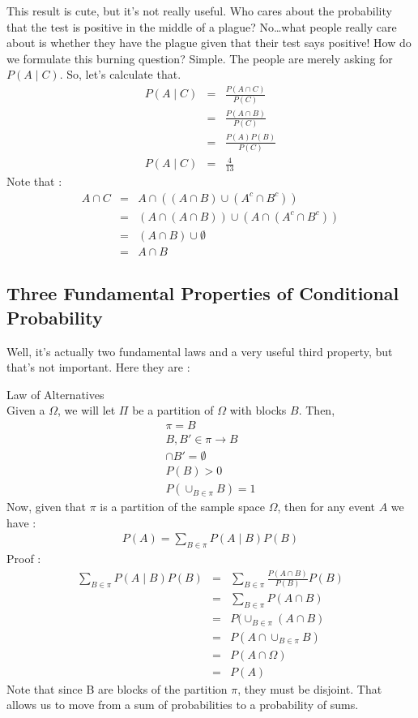 This result is cute, but it's not really useful.  Who cares about the probability that the test is positive in the middle of a plague?  No\ldots what people really care about is whether they have the plague given that their test says positive!  How do we formulate this burning question?  Simple.  The people are merely asking for $P(A \mid C)$.  So, let's calculate that.
\begin{eqnarray*}
P(A \mid C) &=& \frac{P(A \cap C)}{P(C)} \\
            &=& \frac{P(A \cap B)}{P(C)} \\
            &=& \frac{P(A)P(B)}{P(C)}\\
P(A \mid C) &=& \frac{4}{13}
\end{eqnarray*}
Note that : 
\begin{eqnarray*}
A \cap C &=& A \cap ((A \cap B) \cup (A^{c} \cap B^{c}))\\
         &=& (A \cap (A \cap B)) \cup (A \cap (A^{c} \cap B^{c}))\\
         &=& (A \cap B) \cup \emptyset\\
         &=& A \cap B
\end{eqnarray*}
\subsection{Three Fundamental Properties of Conditional Probability}
Well, it's actually two fundamental laws and a very useful third property, but that's not important.  Here they are :

Law of Alternatives\\
Given a $\Omega$, we will let $\Pi$ be a partition of $\Omega$ with blocks $B$.  Then,
\begin{eqnarray*}
\pi = {B} \\
B, B' \in \pi\rightarrow B \\
\cap B' = \emptyset \\
P(B) > 0 \\
P(\cup_{B \in \pi} B) = 1
\end{eqnarray*}
Now, given that $\pi$ is a partition of the sample space $\Omega$, then for any event $A$ we have : 
\begin{eqnarray*}
P(A) = \sum_{B \in \pi}{P(A \mid B)P(B)}
\end{eqnarray*}
Proof : 
\begin{eqnarray*}
\sum_{B \in \pi}{P(A \mid B)P(B)} &=& \sum_{B \in \pi}{\frac{P(A \cap B)}{P(B)} P(B)} \\
                                  &=& \sum_{B \in \pi}{P(A \cap B)} \\
                                  &=& P(\cup_{B \in \pi}{(A \cap B)} \\
                                  &=& P(A \cap \cup_{B \in \pi}{B}) \\
                                  &=& P(A \cap \Omega) \\
                                  &=& P(A)
\end{eqnarray*}
Note that since B are blocks of the partition $\pi$, they must be disjoint.  That allows us to move from a sum of probabilities to a probability of sums.

